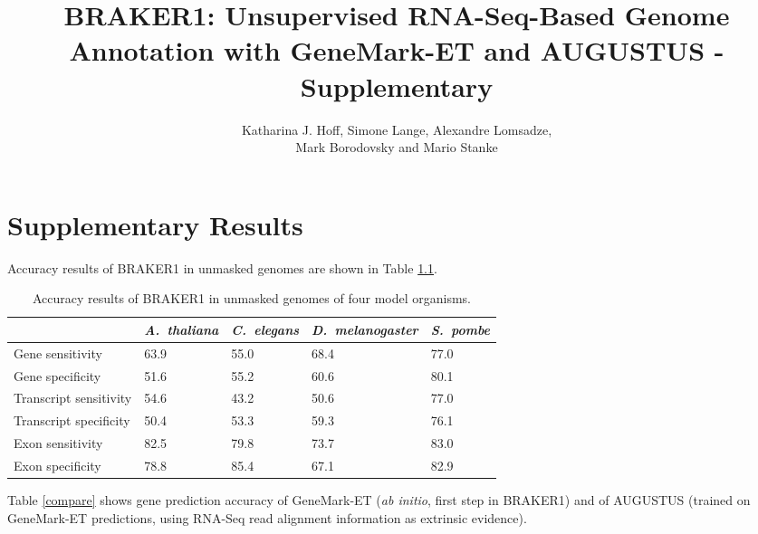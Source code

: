 \documentclass[a4paper,10pt]{report}
\title{BRAKER1: Unsupervised RNA-Seq-Based Genome Annotation with GeneMark-ET and AUGUSTUS - \textbf{Supplementary}}
\author{Katharina J. Hoff, Simone Lange, Alexandre Lomsadze,\\ Mark Borodovsky and Mario Stanke}
\begin{document}
\maketitle

\tableofcontents

\chapter{Supplementary Results}

Accuracy results of BRAKER1 in unmasked genomes are shown in Table \ref{unmasked}.


\begin{table}[htb!]
\caption{Accuracy results of BRAKER1 in unmasked genomes of four model organisms. \label{unmasked}}
\begin{tabular}{lp{.9cm}p{.9cm}p{.9cm}p{.9cm}}\hline
 & \multicolumn{1}{c}{\textit{A.~thaliana}} &  \multicolumn{1}{c}{\textit{C.~elegans}} &  \multicolumn{1}{c}{\textit{D.~melanogaster}} &  \multicolumn{1}{c}{\textit{S.~pombe}}\\
 \hline
Gene sensitivity        & 63.9 & 55.0 & 68.4 & 77.0\\
Gene specificity        & 51.6 & 55.2 & 60.6 & 80.1\\
Transcript sensitivity  & 54.6 & 43.2 & 50.6 & 77.0\\
Transcript specificity  & 50.4 & 53.3 & 59.3 & 76.1\\
Exon sensitivity        & 82.5 & 79.8 & 73.7 & 83.0\\
Exon specificity        & 78.8 & 85.4 & 67.1 & 82.9\\
\hline
\end{tabular}
\end{table}

Table \ref{compare} shows  gene prediction accuracy of GeneMark-ET (\textit{ab initio}, first step in BRAKER1) and of AUGUSTUS (trained on GeneMark-ET predictions, using RNA-Seq read alignment information as extrinsic evidence).
\end{document}

